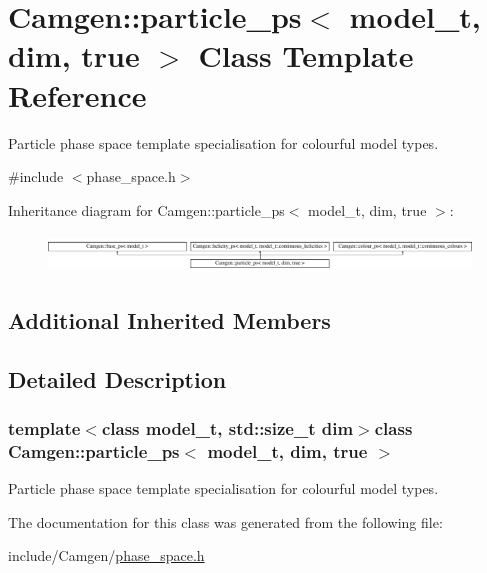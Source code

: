 \hypertarget{a00410}{}\section{Camgen\+:\+:particle\+\_\+ps$<$ model\+\_\+t, dim, true $>$ Class Template Reference}
\label{a00410}


Particle phase space template specialisation for colourful model types.  




{\ttfamily \#include $<$phase\+\_\+space.\+h$>$}

Inheritance diagram for Camgen\+:\+:particle\+\_\+ps$<$ model\+\_\+t, dim, true $>$\+:\begin{figure}[H]
\begin{center}
\leavevmode
\includegraphics[height=0.998218cm]{a00410}
\end{center}
\end{figure}
\subsection*{Additional Inherited Members}


\subsection{Detailed Description}
\subsubsection*{template$<$class model\+\_\+t, std\+::size\+\_\+t dim$>$class Camgen\+::particle\+\_\+ps$<$ model\+\_\+t, dim, true $>$}

Particle phase space template specialisation for colourful model types. 

The documentation for this class was generated from the following file\+:\begin{DoxyCompactItemize}
\item 
include/\+Camgen/\hyperlink{a00718}{phase\+\_\+space.\+h}\end{DoxyCompactItemize}
